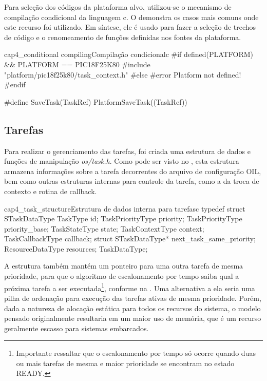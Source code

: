 Para seleção dos códigos da plataforma alvo, utilizou-se o mecanismo de compilação condicional da linguagem c. O  demonstra os casos mais comuns onde este recurso foi utilizado. Em síntese, ele é usado para fazer a seleção de trechos de código e o renomeamento de funções definidas nos fontes da plataforma.

\begin{algoritmo}{cap4_conditional compiling}{Compilação condicional}{c}
#if defined(PLATFORM) &&  PLATFORM == PIC18F25K80
#include "platform/pic18f25k80/task_context.h"
#else
#error Platform not defined!
#endif

#define SaveTask(TaskRef) PlatformSaveTask((TaskRef))
\end{algoritmo}

\subsection{Tarefas}

Para realizar o gerenciamento das tarefas, foi criada uma estrutura de dados e funções de manipulação \emph{os/task.h}. Como pode ser visto no , esta estrutura armazena informações sobre a tarefa decorrentes do arquivo de configuração OIL, bem como outras estruturas internas para controle da tarefa, como a da troca de contexto e rotina de callback.

\begin{algoritmo}{cap4_task_structure}{Estrutura de dados interna para tarefas}{c}
typedef struct STaskDataType {
	TaskType id;
	TaskPriorityType priority;
	TaskPriorityType priority_base;
	TaskStateType state;
	TaskContextType context;
	TaskCallbackType callback;
	struct STaskDataType* next_task_same_priority;
	ResourceDataType resources;
} TaskDataType;
\end{algoritmo}

A estrutura também mantém um ponteiro para uma outra tarefa de mesma prioridade, para que o algoritmo de escalonamento por tempo saiba qual a próxima tarefa a ser executada\footnote{Importante ressaltar que o escalonamento por tempo só ocorre quando duas ou mais tarefas de mesma e maior prioridade se encontram no estado READY.}, conforme na . Uma alternativa a ela seria uma pilha de ordenação para execução das tarefas ativas de mesma prioridade. Porém, dada a natureza de alocação estática para todos os recursos do sistema, o modelo pensado originalmente resultaria em um maior uso de memória, que é um recurso geralmente escasso para sistemas embarcados.

